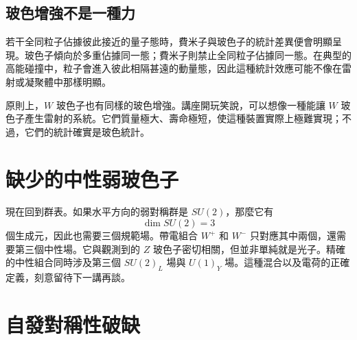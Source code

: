 \subsection{玻色增強不是一種力}

若干全同粒子佔據彼此接近的量子態時，費米子與玻色子的統計差異便會明顯呈現。玻色子傾向於多重佔據同一態；費米子則禁止全同粒子佔據同一態。在典型的高能碰撞中，粒子會進入彼此相隔甚遠的動量態，因此這種統計效應可能不像在雷射或凝聚體中那樣明顯。

原則上，\(W\) 玻色子也有同樣的玻色增強。講座開玩笑說，可以想像一種能讓 \(W\) 玻色子產生雷射的系統。它們質量極大、壽命極短，使這種裝置實際上極難實現；不過，它們的統計確實是玻色統計。

\begin{classroomqa}
\end{classroomqa}

\begin{classroomqa}
\end{classroomqa}

\section{缺少的中性弱玻色子}

現在回到群表。如果水平方向的弱對稱群是 \(SU(2)\)，那麼它有
\begin{equation}
  \dim SU(2)=3
\end{equation}
個生成元，因此也需要三個規範場。帶電組合 \(W^+\) 和 \(W^-\) 只對應其中兩個，還需要第三個中性場。它與觀測到的 \(Z\) 玻色子密切相關，但並非單純就是光子。精確的中性組合同時涉及第三個 \(SU(2)_L\) 場與 \(U(1)_Y\) 場。這種混合以及電荷的正確定義，刻意留待下一講再談。

\section{自發對稱性破缺}

